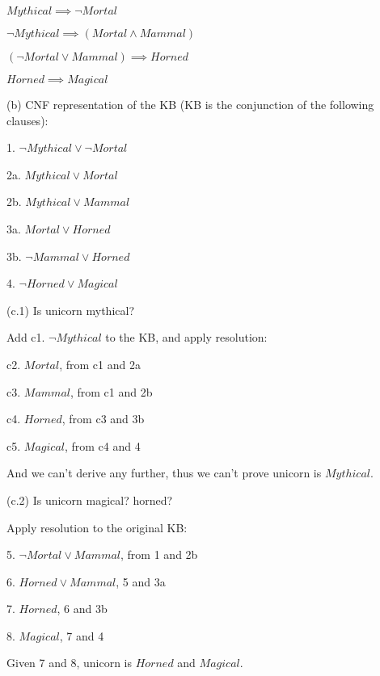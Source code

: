 \documentclass{article}
\begin{document}
$Mythical \implies \neg Mortal$

$\neg Mythical \implies (Mortal \wedge Mammal)$

$(\neg Mortal \vee Mammal) \implies Horned$

$Horned \implies Magical$

\bigbreak
(b) CNF representation of the KB (KB is the conjunction of the following clauses):

1. $\neg Mythical \vee \neg Mortal$

2a. $Mythical \vee Mortal$

2b. $Mythical \vee Mammal$

3a. $Mortal \vee Horned$

3b. $\neg Mammal \vee Horned$

4. $\neg Horned \vee Magical$

\bigbreak
(c.1) Is unicorn mythical? 

Add c1. $\neg Mythical$ to the KB, and apply resolution:

c2. $Mortal$, from c1 and 2a

c3. $Mammal$, from c1 and 2b

c4. $Horned$, from c3 and 3b

c5. $Magical$, from c4 and 4

And we can't derive any further, thus we can't prove unicorn is $Mythical$.

\bigbreak
(c.2) Is unicorn magical? horned? 

Apply resolution to the original KB:

5. $\neg Mortal \vee Mammal$, from 1 and 2b

6. $Horned \vee Mammal$, 5 and 3a

7. $Horned$, 6 and 3b

8. $Magical$, 7 and 4

Given 7 and 8, unicorn is $Horned$ and $Magical$.
\end{document}
